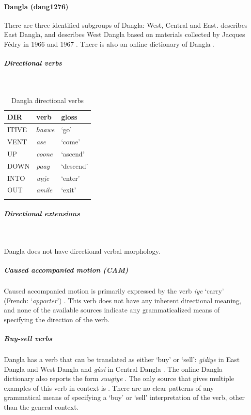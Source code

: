 \paragraph*{Dangla (dang1276)} \label{dang}

There are three identified subgroups of Dangla: West, Central and East. \citet{shayGrammarEastDangla1999} describes East Dangla, and \citet{peustSupplementsWestDangla2016} describes West Dangla based on materials collected by Jacques Fédry in 1966 and 1967 \citep{fedryDictionnaireDangaleatTchad1971}.  There is also an online dictionary of Dangla \citep{webonaryDictionnaireDangaleat2016}.

\newpage
\subparagraph{Directional verbs}~

\begin{table}[H]
	\caption{Dangla directional verbs \citep{webonaryDictionnaireDangaleat2016}} 
	\label{tab:danglaV}
	\begin{tabular}{lll} %
		\lsptoprule
		DIR & verb & gloss   \\ %
		\midrule
		ITIVE & \textit{ɓaawe} & `go' \\
		VENT & \textit{ase} & `come' \\
		UP & \textit{coone} & `ascend' \\
		DOWN & \textit{paay} & `descend' \\
		INTO& \textit{un̰je} & `enter' \\
		OUT & \textit{amile} & `exit' \\

		\lspbottomrule
	\end{tabular}
\end{table}

\subparagraph{Directional extensions}~

Dangla does not have directional verbal morphology. 

\subparagraph{Caused accompanied motion (CAM)}

Caused accompanied motion is primarily expressed by the verb \textit{iye} `carry' (French: `\textit{apporter}') \citep{webonaryDictionnaireDangaleat2016}. This verb does not have any inherent directional meaning, and none of the available sources indicate any grammaticalized means of specifying the direction of the verb. 

\subparagraph{Buy-sell verbs}

Dangla has a verb that can be translated as either `buy' or `sell': \textit{gidiye} in East Dangla  \citep{shayGrammarEastDangla1999} and West Dangla \citep{peustSupplementsWestDangla2016} and \textit{gùsí} in Central Dangla \citep[32]{burkeIntroductionVerbalSystem1995}. The online Dangla dictionary also reports the form \textit{suugiye} \citep{webonaryDictionnaireDangaleat2016}. The only source that gives multiple examples of this verb in context is \citet{shayGrammarEastDangla1999}. There are no clear patterns of any grammatical means of specifying a `buy' or `sell' interpretation of the verb, other than the general context.  

